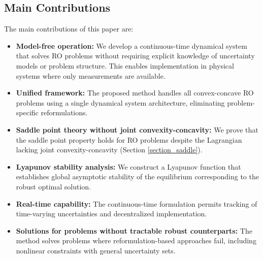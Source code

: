 \documentclass[journal,twoside,web]{ieeecolor}
\newcommand{\rev}[1]{\textcolor{revisionblue}{#1}}
\begin{document}
\subsection*{\rev{Main Contributions}}
{\color{revisionblue}The main contributions of this paper are:
\begin{itemize}
\item \textbf{Model-free operation:} We develop a continuous-time dynamical system that solves RO problems without requiring explicit knowledge of uncertainty models or problem structure. This enables implementation in physical systems where only measurements are available.

\item \textbf{Unified framework:} The proposed method handles all convex-concave RO problems using a single dynamical system architecture, eliminating problem-specific reformulations.

\item \textbf{Saddle point theory without joint convexity-concavity:} We prove that the saddle point property holds for RO problems despite the Lagrangian lacking joint convexity-concavity (Section \ref{section_saddle}).

\item \textbf{Lyapunov stability analysis:} We construct a Lyapunov function that establishes global asymptotic stability of the equilibrium corresponding to the robust optimal solution.

\item \textbf{Real-time capability:} The continuous-time formulation permits tracking of time-varying uncertainties and decentralized implementation.

\item \textbf{Solutions for problems without tractable robust counterparts:} The method solves problems where reformulation-based approaches fail, including nonlinear constraints with general uncertainty sets.
\end{itemize}}


\end{document}
